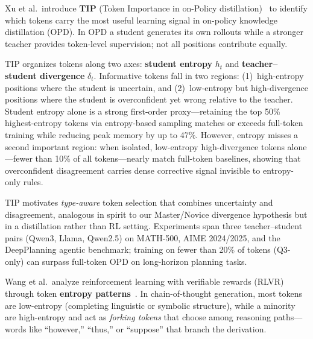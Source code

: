 \documentclass[times, 10pt,twocolumn]{article}
\begin{document}

Xu et al.\ introduce \textbf{TIP} (Token Importance in on-Policy
distillation)~\cite{xu2026tip} to identify which tokens carry the most useful
learning signal in on-policy knowledge distillation (OPD). In OPD a student
generates its own rollouts while a stronger teacher provides token-level
supervision; not all positions contribute equally.

TIP organizes tokens along two axes: \textbf{student entropy} $h_t$ and
\textbf{teacher--student divergence} $\delta_t$. Informative tokens fall in two
regions: (1)~high-entropy positions where the student is uncertain, and
(2)~low-entropy but high-divergence positions where the student is
overconfident yet wrong relative to the teacher. Student entropy alone is a
strong first-order proxy---retaining the top 50\% highest-entropy tokens via
entropy-based sampling matches or exceeds full-token training while reducing
peak memory by up to 47\%. However, entropy misses a second important region:
when isolated, low-entropy high-divergence tokens alone---fewer than 10\% of all
tokens---nearly match full-token baselines, showing that overconfident
disagreement carries dense corrective signal invisible to entropy-only rules.

TIP motivates \emph{type-aware} token selection that combines uncertainty and
disagreement, analogous in spirit to our Master/Novice divergence hypothesis
but in a distillation rather than RL setting. Experiments span three
teacher--student pairs (Qwen3, Llama, Qwen2.5) on MATH-500, AIME 2024/2025,
and the DeepPlanning agentic benchmark; training on fewer than 20\% of tokens
(Q3-only) can surpass full-token OPD on long-horizon planning tasks.



Wang et al.\ analyze reinforcement learning with verifiable rewards (RLVR)
through token \textbf{entropy patterns}~\cite{wang2025forking}. In chain-of-thought
generation, most tokens are low-entropy (completing linguistic or symbolic
structure), while a minority are high-entropy and act as \emph{forking tokens}
that choose among reasoning paths---words like ``however,'' ``thus,'' or
``suppose'' that branch the derivation.
\end{document}
